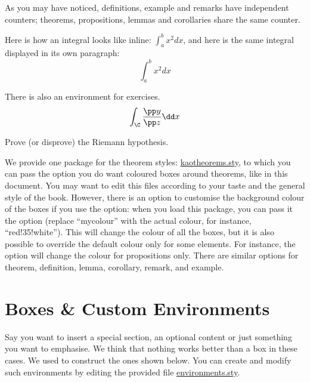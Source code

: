 As you may have noticed, definitions, example and remarks have independent counters; theorems, propositions, lemmas and corollaries share the same counter. 

\begin{remark}
Here is how an integral looks like inline: $\int_{a}^{b} x^2 dx$, and 
here is the same integral displayed in its own paragraph:
\[\int_{a}^{b} x^2 dx\]
\end{remark}


There is also an environment for exercises.
\begin{align}
\int _{\C} \frac{\pp y}{\pp z}\dd x
\end{align}

\begin{exercise}
Prove (or disprove) the Riemann hypothesis.
\end{exercise}

We provide one package for the theorem styles: 
\href{kaotheorems.sty}{kaotheorems.sty}, to which you can pass the 
 option you do want coloured boxes around theorems, like 
in this document. You may want to edit this files according to your taste 
and the general style of the book. However, there is an option to 
customise the background colour of the boxes if you use the 
 option: when you load this package, you can pass it the 
 option (replace \enquote{mycolour} with the 
actual colour, for instance, \enquote{red!35!white}). This will change 
the colour of all the boxes, but it is also possible to override the 
default colour only for some elements. For instance, the 
 option will change the colour 
for propositions only. There are similar options for theorem, 
definition, lemma, corollary, remark, and example.

\section[Boxes \& Environments]{Boxes \& Custom Environments}

Say you want to insert a special section, an optional content or just 
something you want to emphasise. We think that nothing works better than 
a box in these cases. We used  to construct the ones 
shown below. You can create and modify such environments by editing the 
provided file \href{style/environments.sty}{environments.sty}.


